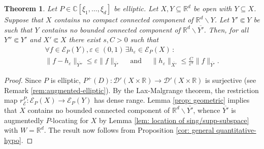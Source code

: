 \documentclass[12pt]{amsart}
\newcommand{\R}{\mathbb{R}}
\newcommand{\C}{\mathbb{C}}
\newtheorem{theorem}{Theorem}[section]
\theoremstyle{definition}
\theoremstyle{remark}
\numberwithin{equation}{section}
\begin{document}
\begin{theorem}\label{theo: quantitative Runge for elliptic-1}
	Let $P\in\C[\xi_1,\ldots,\xi_d]$ be elliptic. Let $X,Y \subseteq\R^d$ be open with $Y \subseteq X$. Suppose that $X$ contains no compact connected component of $\R^d\backslash Y$. Let $Y'\Subset Y$ be  such that $Y$ contains no bounded connected component of  $\R^d\backslash\overline{Y'}$. Then, for all $Y'' \Subset Y'$ and $X' \Subset X$  there exist $s, C>0$ such that
	\begin{gather}
		\label{approx-sect}
		\forall f\in\mathscr{E}_P(Y), \varepsilon\in (0,1) \,\exists h_\varepsilon \in\mathscr{E}_P(X) \, :\\ \nonumber
		\|f-h_\varepsilon\|_{\overline{Y''}}\leq \varepsilon\|f\|_{\overline{Y'}} \quad \mbox{ and } \quad \|h_\varepsilon\|_{\overline{X'}}\leq\frac{C}{\varepsilon^s}\|f\|_{\overline{Y'}}.
	\end{gather}
\end{theorem}

\begin{proof}
	Since $P$ is elliptic,  $P^+(D): \mathscr{D}'(X\times\R) \to \mathscr{D}'(X\times\R)$ is surjective (see Remark \ref{rem:augmented-elliptic}). By the Lax-Malgrange theorem, the restriction map $r_\mathscr{E}^P:\mathscr{E}_P(X)\rightarrow\mathscr{E}_P(Y)$ has dense range.  Lemma \ref{prop: geometric} implies that $X$ contains no bounded connected component of $\R^d\backslash \overline{Y'}$, whence $\overline{Y'}$ is augmentedly $P$-locating for $X$ by Lemma \ref{lem: location of sing/supp-subspace} with $W = \R^d$.  The result now  follows from Proposition \ref{cor: general quantitative-hypo}.
\end{proof}
\end{document}
